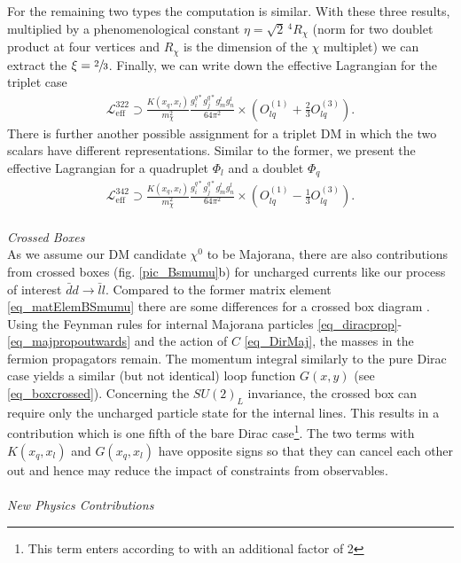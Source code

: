 For the remaining two types the computation is similar. With these three results, multiplied by a 
phenomenological constant $\eta=\sqrt{2}\,^4 R_\chi$ (norm for two doublet product at four vertices and $R_\chi$ is the dimension of the $\chi$ multiplet) 
we can extract the $\xi=\sfrac23$. Finally, we can write down the effective Lagrangian for the triplet case
\begin{align}
 \mathcal{L}^{{322}}_\text{eff} \supset \frac{K(x_q,x_l)}{m_\chi^2}\frac{g_i^{q*} g_j^{q*} g_m^l g_n^l}{64\pi^2}\times\left(O_{lq}^{(1)} + \frac23 O_{lq}^{(3)}\right).
 \label{eq_LagBSmumuModB}
\end{align}
There is further another possible assignment for a triplet DM in which the two scalars have different representations. Similar to the former, we
present the effective Lagrangian for a quadruplet $\Phi_l$ and a doublet $\Phi_q$
\begin{align}
 \mathcal{L}^{{342}}_\text{eff} \supset \frac{K(x_q,x_l)}{m_\chi^2}\frac{g_i^{q*} g_j^{q*} g_m^l g_n^l}{64\pi^2}\times\left(O_{lq}^{(1)} - \frac13 O_{lq}^{(3)}\right).
 \label{eq_LagBSmumuModC}
\end{align}
\\ \textit{Crossed Boxes}\\
\noindent As we assume our DM candidate $\chi^0$ to be Majorana, there are also contributions from crossed boxes (fig. \ref{pic_Bsmumu}b) for uncharged
currents like our process of interest $\bar d d\rightarrow \bar l l$. Compared to the former matrix element \eqref{eq_matElemBSmumu} there are
some differences for a crossed box diagram \cite{1411.6743}. Using the Feynman rules for internal Majorana particles 
\eqref{eq_diracprop}-\eqref{eq_majpropoutwards} and the action of $C$ \eqref{eq_DirMaj}, 
the masses in the fermion propagators remain. The momentum integral similarly to the pure Dirac case yields
a similar (but not identical) loop function $G(x,y)$ (see \eqref{eq_boxcrossed}).
Concerning the $SU(2)_L$ invariance, the crossed box can require only the uncharged particle state for the internal lines. 
This results in a contribution which is one fifth of the bare Dirac case\footnote{This term enters according to \cite{1608.07832} with an additional 
factor of 2}. The two terms with $K(x_q,x_l)$ and $G(x_q,x_l)$ have opposite signs so 
that they can cancel each other out and hence may reduce the impact of constraints from observables.\\
\\ \textit{New Physics Contributions}\\
